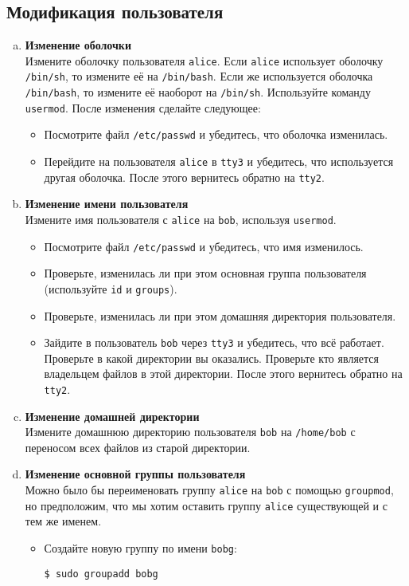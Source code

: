 \documentclass{article}
\begin{document}
\newpage
\subsection{Модификация пользователя}
\begin{enumerate}[a.]
\item \textbf{Изменение оболочки}\\
Измените оболочку пользователя \texttt{alice}. Если \texttt{alice} использует оболочку \texttt{/bin/sh}, то измените её на \texttt{/bin/bash}. Если же используется оболочка \texttt{/bin/bash}, то измените её наоборот на \texttt{/bin/sh}. Используйте команду \texttt{usermod}. После изменения сделайте следующее:
\begin{itemize}
\item Посмотрите файл \texttt{/etc/passwd} и убедитесь, что оболочка изменилась.
\item Перейдите на пользователя \texttt{alice} в \texttt{tty3} и убедитесь, что используется другая оболочка. После этого вернитесь обратно на \texttt{tty2}.
\end{itemize}

\item \textbf{Изменение имени пользователя}\\
Измените имя пользователя с \texttt{alice} на \texttt{bob}, используя \texttt{usermod}.
\begin{itemize}
\item Посмотрите файл \texttt{/etc/passwd} и убедитесь, что имя изменилось.
\item Проверьте, изменилась ли при этом основная группа пользователя (используйте \texttt{id} и \texttt{groups}).
\item Проверьте, изменилась ли при этом домашняя директория пользователя.
\item Зайдите в пользователь \texttt{bob} через \texttt{tty3} и убедитесь, что всё работает. Проверьте в какой директории вы оказались. Проверьте кто является владельцем файлов в этой директории. После этого вернитесь обратно на \texttt{tty2}.
\end{itemize}


\item \textbf{Изменение домашней директории}\\
Измените домашнюю директорию пользователя \texttt{bob} на \texttt{/home/bob} с переносом всех файлов из старой директории.

\item \textbf{Изменение основной группы пользователя}\\
Можно было бы переименовать группу \texttt{alice} на \texttt{bob} с помощью \texttt{groupmod}, но предположим, что мы хотим оставить группу \texttt{alice} существующей и с тем же именем.
\begin{itemize}
\item Создайте новую группу по имени \texttt{bobg}:
\begin{lstlisting}
$ sudo groupadd bobg
\end{lstlisting}


\end{itemize}
\end{enumerate}
\end{document}
